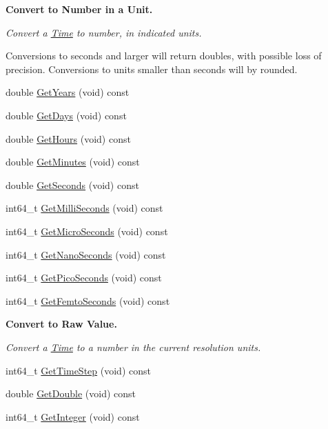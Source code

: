 \begin{Indent}{\bf Convert to Number in a Unit.}\par
{\em Convert a \hyperlink{classns3_1_1Time}{Time} to number, in indicated units.

Conversions to seconds and larger will return doubles, with possible loss of precision. Conversions to units smaller than seconds will by rounded. }\begin{DoxyCompactItemize}
\item 
double \hyperlink{classns3_1_1Time_aa075cad5956a6074b90ed79ddf869a6c}{Get\+Years} (void) const 
\item 
double \hyperlink{classns3_1_1Time_ac9253ea7519b3780fb6db3ff81efbcd6}{Get\+Days} (void) const 
\item 
double \hyperlink{classns3_1_1Time_ab63a464701fb20020450eeb60158740a}{Get\+Hours} (void) const 
\item 
double \hyperlink{classns3_1_1Time_abc2acc50a5594050d6869f5dfd83f57c}{Get\+Minutes} (void) const 
\item 
double \hyperlink{classns3_1_1Time_a8f20d5c3b0902d7b4320982f340b57c8}{Get\+Seconds} (void) const 
\item 
int64\+\_\+t \hyperlink{classns3_1_1Time_aba3428a8b6c4c8d9014ce44145081f34}{Get\+Milli\+Seconds} (void) const 
\item 
int64\+\_\+t \hyperlink{classns3_1_1Time_a2542b9273c336da11fcaf54e8bc6e4c8}{Get\+Micro\+Seconds} (void) const 
\item 
int64\+\_\+t \hyperlink{classns3_1_1Time_a2fdb7bf0e1f5cd93b6149cb37bbb7f08}{Get\+Nano\+Seconds} (void) const 
\item 
int64\+\_\+t \hyperlink{classns3_1_1Time_a37d779ab1dc746255dd7a9864e5ea39b}{Get\+Pico\+Seconds} (void) const 
\item 
int64\+\_\+t \hyperlink{classns3_1_1Time_a53f9fa38f86a0315515b1acaec5bba50}{Get\+Femto\+Seconds} (void) const 
\end{DoxyCompactItemize}
\end{Indent}
\begin{Indent}{\bf Convert to Raw Value.}\par
{\em Convert a \hyperlink{classns3_1_1Time}{Time} to a number in the current resolution units. }\begin{DoxyCompactItemize}
\item 
int64\+\_\+t \hyperlink{classns3_1_1Time_a40a7025b73dac7d02f8a4e1e54eaa5b5}{Get\+Time\+Step} (void) const 
\item 
double \hyperlink{classns3_1_1Time_a303bcdd30438760a958b4eee799c83e8}{Get\+Double} (void) const 
\item 
int64\+\_\+t \hyperlink{classns3_1_1Time_a8c88e10860be3bc0cfabdbd92df42cff}{Get\+Integer} (void) const 
\end{DoxyCompactItemize}
\end{Indent}
